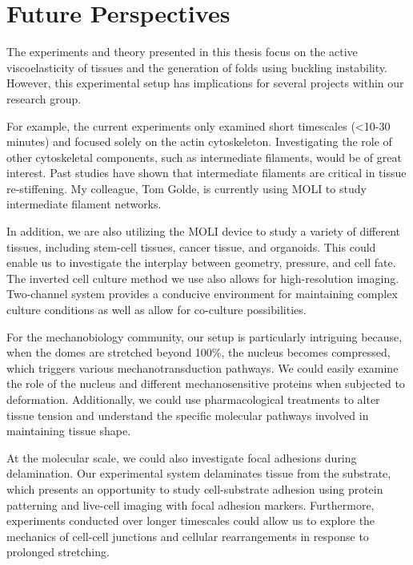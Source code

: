 \hypertarget{future-perspectives}{%
	\section{Future Perspectives}\label{future-perspectives}}

The experiments and theory presented in this thesis focus on the active viscoelasticity of tissues and the generation of folds using buckling instability. However, this experimental setup has implications for several projects within our research group.

For example, the current experiments only examined short timescales (<10-30 minutes) and focused solely on the actin cytoskeleton. Investigating the role of other cytoskeletal components, such as intermediate filaments, would be of great interest. Past studies have shown that intermediate filaments are critical in tissue re-stiffening. My colleague, Tom Golde, is currently using MOLI to study intermediate filament networks.

In addition, we are also utilizing the MOLI device to study a variety of different tissues, including stem-cell tissues, cancer tissue, and organoids. This could enable us to investigate the interplay between geometry, pressure, and cell fate. The inverted cell culture method we use also allows for high-resolution imaging. Two-channel system provides a conducive environment for maintaining complex culture conditions as well as allow for co-culture possibilities.

For the mechanobiology community, our setup is particularly intriguing because, when the domes are stretched beyond 100\%, the nucleus becomes compressed, which triggers various mechanotransduction pathways. We could easily examine the role of the nucleus and different mechanosensitive proteins when subjected to deformation. Additionally, we could use pharmacological treatments to alter tissue tension and understand the specific molecular pathways involved in maintaining tissue shape.

At the molecular scale, we could also investigate focal adhesions during delamination. Our experimental system delaminates tissue from the substrate, which presents an opportunity to study cell-substrate adhesion using protein patterning and live-cell imaging with focal adhesion markers. Furthermore, experiments conducted over longer timescales could allow us to explore the mechanics of cell-cell junctions and cellular rearrangements in response to prolonged stretching.

